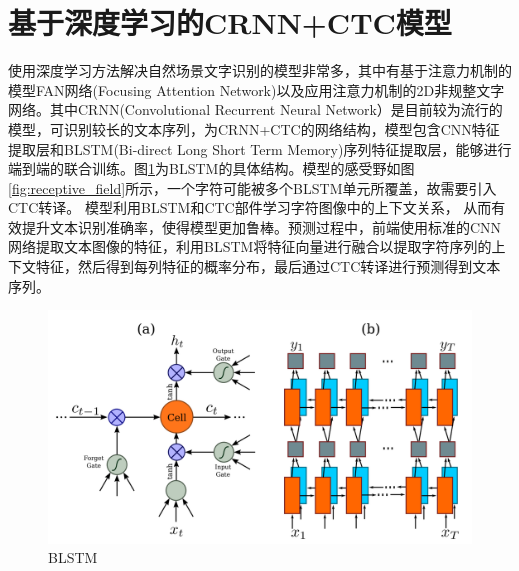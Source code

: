 \documentclass[12pt,a4paper]{ctexart}
\begin{document}
\section{基于深度学习的CRNN+CTC模型}
使用深度学习方法解决自然场景文字识别的模型非常多，其中有基于注意力机制的模型FAN网络(Focusing Attention Network)\cite{FAN}以及应用注意力机制的2D非规整文字网络\cite{2D-ATTN}。其中CRNN(Convolutional Recurrent Neural Network）\cite{CRNN}是目前较为流行的模型，可识别较长的文本序列，为CRNN+CTC的网络结构，模型包含CNN特征提取层和BLSTM(Bi-direct Long Short Term Memory)\cite{BLSTM}序列特征提取层，能够进行端到端的联合训练。图\ref{fig:blstm}为BLSTM的具体结构。模型的感受野如图\ref{fig:receptive_field}所示，一个字符可能被多个BLSTM单元所覆盖，故需要引入CTC转译。 模型利用BLSTM和CTC\cite{Graves:2006:CTC:1143844.1143891}部件学习字符图像中的上下文关系， 从而有效提升文本识别准确率，使得模型更加鲁棒。预测过程中，前端使用标准的CNN网络提取文本图像的特征，利用BLSTM将特征向量进行融合以提取字符序列的上下文特征，然后得到每列特征的概率分布，最后通过CTC转译进行预测得到文本序列。


\begin{figure}[H]
	\centering
	\includegraphics[width=1\linewidth]{images/blstm}
	\caption{BLSTM}
	\label{fig:blstm}
\end{figure}
\end{document}
